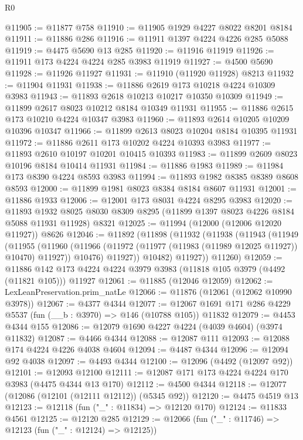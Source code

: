 \begin{lexlean}{R0}
\begin{coremodule}
@11905 := @11877 @758
@11910 := @11905 @1929 @4227 @8022 @8201 @8184
@11911 := @11886 @286
@11916 := @11911 @1397 @4224 @4226 @285 @5088
@11919 := @4475 @5690 @13 @285
@11920 := @11916 @11919
@11926 := @11911 @173 @4224 @4224 @285 @3983 @11919
@11927 := @4500 @5690
@11928 := @11926 @11927
@11931 := @11910 (@11920 @11928) @8213
@11932 := @11904 @11931
@11938 := @11886 @2619 @173 @10218 @4224 @10309 @3983
@11943 := @11893 @2618 @10213 @10217 @10350 @10309
@11949 := @11899 @2617 @8023 @10212 @8184 @10349 @11931
@11955 := @11886 @2615 @173 @10210 @4224 @10347 @3983
@11960 := @11893 @2614 @10205 @10209 @10396 @10347
@11966 := @11899 @2613 @8023 @10204 @8184 @10395 @11931
@11972 := @11886 @2611 @173 @10202 @4224 @10393 @3983
@11977 := @11893 @2610 @10197 @10201 @10415 @10393
@11983 := @11899 @2609 @8023 @10196 @8184 @10414 @11931
@11984 := @11886 @1983
@11989 := @11984 @173 @8390 @4224 @8593 @3983
@11994 := @11893 @1982 @8385 @8389 @8608 @8593
@12000 := @11899 @1981 @8023 @8384 @8184 @8607 @11931
@12001 := @11886 @1933
@12006 := @12001 @173 @8031 @4224 @8295 @3983
@12020 := @11893
    @1932
    @8025
    @8030
    @8309
    @8295
    (@11899 @1397 @8023 @4226 @8184 @5088 @11931 @11928)
    @8321
@12025 := @11994 (@12000 (@12006 @12020 @11927)) @8626
@12046 := @11892
    (@11898
      (@11932
        (@11938
          (@11943
            (@11949
              (@11955
                (@11960
                  (@11966 (@11972 (@11977 (@11983 (@11989 @12025 @11927)) @10470) @11927))
                  @10476)
                @11927))
            @10482)
          @11927))
      @11260)
@12059 := @11886 @142 @173 @4224 @4224 @3979 @3983 (@11818 @105 @3979 (@4492 (@11821 @105))) @11927
@12061 := @11885 (@12046 @12059)
@12062 := LexLeanPreservation.prim_natLe
@12066 := @11876 (@12061 (@12062 @10990 @3978))
@12067 := @4377 @4344
@12077 := @12067 @1691 @171 @286 @4229 @5537 (fun (__b : @3970) => @146 (@10788 @105)) @11832
@12079 := @4453 @4344 @155
@12086 := @12079 @1690 @4227 @4224 (@4039 @4604) (@3974 @11832)
@12087 := @4466 @4344
@12088 := @12087 @111
@12093 := @12088 @174 @4224 @4226 @4038 @4604
@12094 := @4487 @4344
@12096 := @12094 @92 @4038
@12097 := @4493 @4344
@12100 := @12096 (@4492 (@12097 @92))
@12101 := @12093 @12100
@12111 := @12087 @171 @173 @4224 @4224 @170 @3983 (@4475 @4344 @13 @170)
@12112 := @4500 @4344
@12118 := @12077 (@12086 (@12101 (@12111 @12112)) (@5345 @92))
@12120 := @4475 @4519 @13
@12123 := @12118 (fun ("_" : @11834) => @12120 @170)
@12124 := @11833 @4561
@12125 := @12120 @285
@12129 := @12066 (fun ("_" : @11746) => @12123 (fun ("_" : @12124) => @12125))

\end{coremodule}
\end{lexlean}
